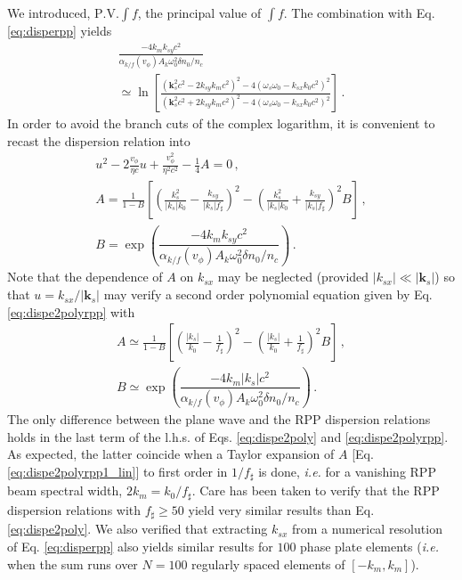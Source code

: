 \documentclass[
 reprint,
 superscriptaddress,
 amsmath,amssymb,
 aps,
]{revtex4-1}
\begin{document}
We introduced, $\mathrm{P.V.}\int f$, the principal value of $\int f$.
The combination with Eq. \eqref{eq:disperpp} yields
\begin{align}
 \frac{-4k_mk_{sy}c^2}{\alpha_{k/f}(v_\phi)A_k \omega_0^2\delta n_0/n_c  } \nonumber\\
 \simeq  \ln\left[
 \frac{ (\mathbf{k}_s^2c^2-2k_{sy} k_m c^2)^2 -4(\omega_s\omega_0 - k_{sx}k_0 c^2)^2}{ (\mathbf{k}_s^2c^2+2k_{sy} k_m c^2)^2 -4(\omega_s\omega_0 - k_{sx}k_0 c^2)^2} \right] \, .\label{eq:disperpp2} 
\end{align}
In order to avoid the branch cuts of the complex logarithm, it is convenient to recast the dispersion relation into 
\begin{align}
u^2 -2\frac{v_\phi}{\eta c}u +\frac{v_\phi^2}{\eta^2 c^2}-\frac{1}{4}A =0 
\, , \label{eq:dispe2polyrpp} \\
A= \frac{1}{1-B}\left[ \left(\frac{k_{s}^2}{\vert k_{s}\vert k_0}-\frac{k_{sy}}{\vert k_{s}\vert f_\sharp}\right)^2-\left(\frac{k_{s}^2}{\vert k_{s}\vert k_0}+\frac{k_{sy}}{\vert k_{s}\vert f_\sharp}\right)^2B  \right]\, , \label{eq:dispe2polyrpp1}  \\ 
B =\exp\left(\dfrac{-4k_m  k_{sy}c^2}{\alpha_{k/f}(v_\phi)A_k \omega_0^2\delta n_0/n_c  }\right)\, .
\label{eq:dispe2polyrpp2} 
\end{align}
Note that the dependence of $A$ on $k_{sx}$ may be neglected (provided  $\vert k_{sx}\vert \ll \vert \mathbf{k}_s\vert$)  so that  $u =  k_{sx}/\vert \mathbf{k}_s\vert$  may verify  a second order polynomial equation given by Eq. \eqref{eq:dispe2polyrpp} with
\begin{align}
A\simeq \frac{1}{1-B}\left[ \left(\frac{\vert k_{s}\vert}{k_0}-\frac{1}{f_\sharp}\right)^2-\left(\frac{\vert k_{s}\vert}{k_0}+\frac{1}{f_\sharp}\right)^2B  \right]\, , \label{eq:dispe2polyrpp1_lin}  \\ 
B \simeq \exp\left(\dfrac{-4k_m \vert k_{s}\vert c^2}{\alpha_{k/f}(v_\phi)A_k \omega_0^2\delta n_0/n_c  }\right)\, .
\label{eq:dispe2polyrpp2_lin} 
\end{align}
The only difference between the plane wave and the RPP dispersion relations holds in the last term of the l.h.s. of Eqs. \eqref{eq:dispe2poly} and \eqref{eq:dispe2polyrpp}. 
As expected,  the latter coincide when  a Taylor expansion of $A$ [Eq. \eqref{eq:dispe2polyrpp1_lin}] to first order  in $1/f_\sharp$ is done, \emph{i.e.} for a vanishing  RPP beam spectral width, $2k_m=k_0/f_\sharp$.
Care has been taken to verify that the RPP dispersion relations with  $f_\sharp \ge 50$ yield  very similar results than Eq. \eqref{eq:dispe2poly}. 
We also verified that extracting $k_{sx}$ from a numerical resolution of Eq. \eqref{eq:disperpp} also yields similar results for $100$ phase plate elements (\emph{i.e.} when the sum runs over $N=100$ regularly spaced elements of $[-k_m,k_m]$).
\end{document}
